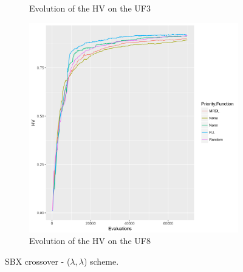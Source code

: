 \begin{figure}[!t]
\begin{subfigure}[b]{0.33\textwidth}
		\caption{Evolution of the HV on the UF3}
	\end{subfigure}
	\begin{subfigure}[b]{0.33\textwidth}
		\centering
		\includegraphics[width=1\textwidth, height=1\textwidth]{images/UF8hv_all}
		\caption{Evolution of the HV on the UF8}
	\end{subfigure}
	\caption{SBX crossover - ($\lambda, \lambda$) scheme.}
\label{evolution_hv}
\end{figure}

